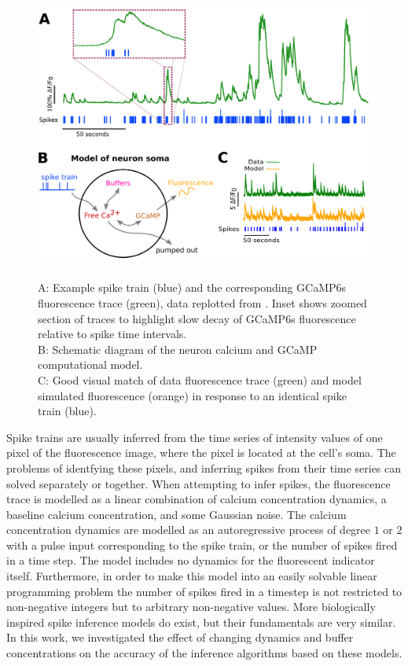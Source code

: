\documentclass[a4paper,12pt]{article}
\theoremstyle{definition}
\begin{document}
\begin{figure}[h]
    \centering
    \includegraphics[width=\textwidth]{figures/Figure1.png}
  \caption{\\ A: Example spike train (blue) and the corresponding GCaMP6s fluorescence trace (green), data replotted from \cite{berens}. Inset shows zoomed section of traces to highlight slow decay of GCaMP6s fluorescence relative to spike time intervals.\\
  B: Schematic diagram of the neuron calcium and GCaMP computational model.\\
  C: Good visual match of data fluorescence trace (green) and model simulated fluorescence (orange) in response to an identical spike train (blue).}
  \label{fig:spike_finder_example}
\end{figure}

Spike trains are usually inferred from the time series of intensity values of one pixel of the fluorescence image, where the pixel is located at the cell's soma. The problems of identfying these pixels, and inferring spikes from their time series can solved separately or together. When attempting to infer spikes, the fluorescence trace is modelled as a linear combination of calcium concentration dynamics, a baseline calcium concentration, and some Gaussian noise. The calcium concentration dynamics are modelled as an autoregressive process of degree $1$ or $2$ with a pulse input corresponding to the spike train, or the number of spikes fired in a time step. The model includes no dynamics for the fluorescent indicator itself. Furthermore, in order to make this model into an easily solvable linear programming problem the number of spikes fired in a timestep is not restricted to non-negative integers but to arbitrary non-negative values\cite{vogelstein, pnevmatikakis, friedrich, paninski1, paninski2}. More biologically inspired spike inference models do exist\cite{deneux}, but their fundamentals are very similar. In this work, we investigated the effect of changing dynamics and buffer concentrations on the accuracy of the inference algorithms based on these models.
\end{document}
